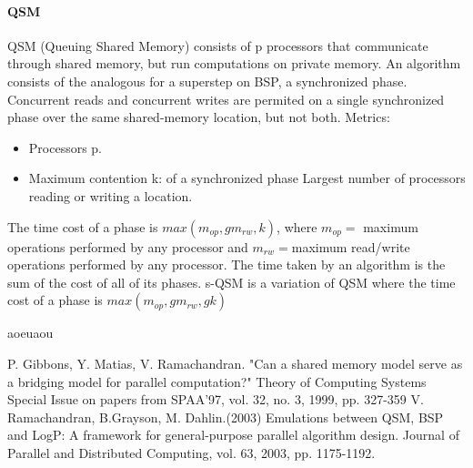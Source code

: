 \documentclass[12pt,a4paper]{article}
\begin{document}
\paragraph{QSM}
QSM (Queuing Shared Memory) consists of p processors that communicate through shared memory, but run computations on private memory. An algorithm consists of the analogous for a superstep on BSP, a synchronized phase. Concurrent reads and concurrent writes are permited on a single synchronized phase over the same shared-memory location, but not both.
Metrics:
\begin{itemize}
	\item Processors p.
	\item Maximum contention k: of a synchronized phase Largest number of processors reading or writing a location.
\end{itemize}
The time cost of a phase is $max(m_{op}, gm_{rw}, k)$, where $m_{op}= $ maximum operations performed by any processor and $m_{rw}=$maximum read/write operations performed by any processor. The time taken by an algorithm is the sum of the cost of all of its phases.
\singlespace
s-QSM is a variation of QSM where the time cost of a phase is $max(m_{op}, gm_{rw}, gk)$

\newpage
aoeuaou

\begin{thebibliography}{9}

 P. Gibbons, Y. Matias, V. Ramachandran. "Can a shared memory model serve as a bridging model for parallel computation?" Theory of Computing Systems Special Issue on papers from SPAA'97, vol. 32, no. 3, 1999, pp. 327-359
 V. Ramachandran, B.Grayson, M. Dahlin.(2003) Emulations between QSM, BSP and LogP: A framework for general-purpose parallel algorithm design. Journal of Parallel and Distributed Computing, vol. 63, 2003, pp. 1175-1192. 
\end{thebibliography}
\end{document}
